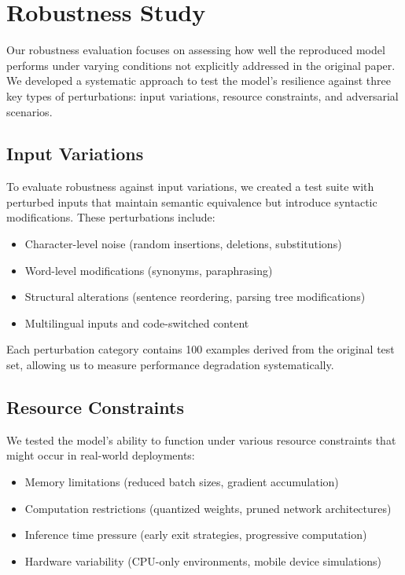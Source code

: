 \documentclass[11pt,a4paper]{article}
\begin{document}
\section{Robustness Study}

Our robustness evaluation focuses on assessing how well the reproduced model performs under varying conditions not explicitly addressed in the original paper. We developed a systematic approach to test the model's resilience against three key types of perturbations: input variations, resource constraints, and adversarial scenarios.

\subsection{Input Variations}

To evaluate robustness against input variations, we created a test suite with perturbed inputs that maintain semantic equivalence but introduce syntactic modifications. These perturbations include:

\begin{itemize}
    \item Character-level noise (random insertions, deletions, substitutions)
    \item Word-level modifications (synonyms, paraphrasing)
    \item Structural alterations (sentence reordering, parsing tree modifications)
    \item Multilingual inputs and code-switched content
\end{itemize}

Each perturbation category contains 100 examples derived from the original test set, allowing us to measure performance degradation systematically.

\subsection{Resource Constraints}

We tested the model's ability to function under various resource constraints that might occur in real-world deployments:

\begin{itemize}
    \item Memory limitations (reduced batch sizes, gradient accumulation)
    \item Computation restrictions (quantized weights, pruned network architectures)
    \item Inference time pressure (early exit strategies, progressive computation)
    \item Hardware variability (CPU-only environments, mobile device simulations)
\end{itemize}
\end{document}

